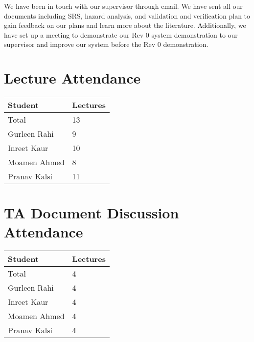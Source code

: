 \documentclass{article}
\begin{document}
We have been in touch with our supervisor through email. We have sent all our documents including SRS, hazard analysis, and validation and verification plan to gain feedback on our plans and learn more about the literature. Additionally, we have set up a meeting to demonstrate our Rev 0 system demonstration to our supervisor and improve our system before the Rev 0 demonstration. 


\section{Lecture Attendance}


\begin{table}[H]
\centering
\begin{tabular}{ll}
\toprule
\textbf{Student} & \textbf{Lectures}\\
\midrule
Total & 13\\
Gurleen Rahi & 9\\ 
Inreet Kaur & 10\\
Moamen Ahmed & 8\\
Pranav Kalsi & 11\\
\bottomrule
\end{tabular}
\end{table}


\section{TA Document Discussion Attendance}


\begin{table}[H]
\centering
\begin{tabular}{ll}
\toprule
\textbf{Student} & \textbf{Lectures}\\
\midrule
Total & 4\\
Gurleen Rahi & 4\\
Inreet Kaur & 4\\
Moamen Ahmed & 4\\
Pranav Kalsi & 4\\
\bottomrule
\end{tabular}
\end{table}
\end{document}
